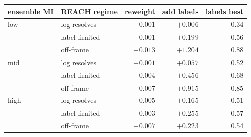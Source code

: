 \begin{tabular}{llrrr}
\toprule
ensemble MI & REACH regime & reweight & add labels & labels best \\
\midrule
low & log resolves & $+0.001$ & $+0.006$ & 0.34 \\
 & label-limited & $-0.001$ & $+0.199$ & 0.56 \\
 & off-frame & $+0.013$ & $+1.204$ & 0.88 \\
\midrule
mid & log resolves & $+0.001$ & $+0.057$ & 0.52 \\
 & label-limited & $-0.004$ & $+0.456$ & 0.68 \\
 & off-frame & $+0.007$ & $+0.915$ & 0.85 \\
\midrule
high & log resolves & $+0.005$ & $+0.165$ & 0.51 \\
 & label-limited & $+0.003$ & $+0.255$ & 0.57 \\
 & off-frame & $+0.007$ & $+0.223$ & 0.54 \\
\bottomrule
\end{tabular}
